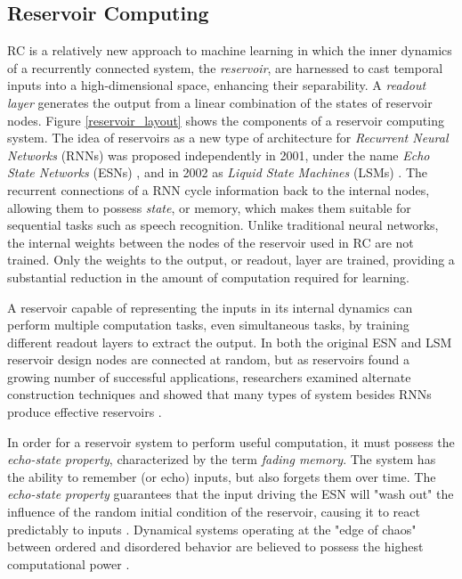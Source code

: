 \documentclass{elsarticle}
\begin{document}
\begin{multicols}{2}
	\subsection{Reservoir Computing}
	RC is a relatively new approach to machine learning in which  the inner 
	dynamics of a recurrently connected system, the \textit{reservoir}, are 
	harnessed to cast temporal inputs into a high-dimensional space, enhancing 
	their separability.  A \textit{readout layer} generates the output from a 
	linear combination of the states of reservoir nodes.  Figure 
	\ref{reservoir_layout} shows the components of a reservoir computing 
	system.  The idea of reservoirs as a new type of architecture for 
	\textit{Recurrent Neural Networks} (RNNs) was proposed independently in 
	2001, under the name \textit{Echo State Networks} (ESNs) 
	\cite{jaeger2001echo}, and in 2002 as \textit{Liquid State Machines} (LSMs) 
	\cite{maass2002real}.  The recurrent connections of a RNN cycle information 
	back to the internal nodes, allowing them to possess \textit{state}, or 
	memory, which makes them suitable for sequential tasks such as speech 
	recognition. Unlike traditional neural networks, the internal weights 
	between the nodes of the reservoir used in RC are not trained.  Only the 
	weights to the output, or readout, layer are trained, providing a 
	substantial reduction in the amount of computation required for learning.  
	\par  A reservoir capable of representing the inputs in its internal 
	dynamics can perform multiple computation tasks, even simultaneous tasks, 
	by training different readout layers to extract the output. In 
	both the original ESN and LSM reservoir design
	nodes are connected at random, but as reservoirs found a growing number of 
	successful applications, researchers examined alternate construction techniques 
	\cite{lukovsevicius2007overview} and showed that many types of system besides 
	RNNs produce effective reservoirs \cite{tanaka2018recent}.\par
	In order for a reservoir system to perform useful computation, it must 
	possess the \textit{echo-state property}, characterized by the term 
	\textit{fading memory}.  The system has the ability to remember (or echo) 
	inputs, but also forgets them over time. The \textit{echo-state property} 
	guarantees that the input driving the ESN will "wash out" the influence of 
	the random initial condition of the reservoir, causing it to react 
	predictably to inputs \cite{jaeger2001echo}. Dynamical systems operating at 
	the "edge of chaos" between ordered and disordered behavior are believed  
	to possess the highest computational power 
	\cite{langton1990computation}\cite{legenstein2007edge}.
	

\end{multicols}
\end{document}

